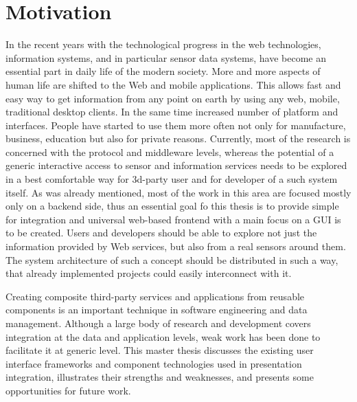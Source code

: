 \section{Motivation}
     In the recent years with the technological progress in the web technologies, information systems, and in particular sensor data systems, have become an essential part in daily life of the modern society. More and more aspects of human life are shifted to the Web and mobile applications. This allows fast and easy way to get information from any point on earth by using any web, mobile, traditional desktop clients. In the same time increased number of platform and interfaces. People have started to use them more often not only for manufacture, business, education but also for private reasons. Currently, most of the research is concerned with the protocol and middleware levels, whereas the potential of a generic interactive access to sensor and information services needs to be explored in a best comfortable way for 3d-party user and for developer of a such system itself. As was already mentioned, most of the work in this area are focused mostly only on a backend side, thus an essential goal fo this thesis is to provide simple for integration and universal web-based frontend with a main focus on a GUI is to be created. Users and developers should be able to explore not just the information provided by Web services, but also from a real sensors around them. The system architecture of such a concept should be distributed in such a way, that already implemented projects could easily interconnect with it.

     Creating composite third-party services and applications from reusable components is an important technique in software engineering and data management. Although a large body of research and development covers integration at the data and application levels, weak work has been done to facilitate it at generic level. This master thesis discusses the existing user interface frameworks and component technologies used in presentation integration, illustrates their strengths and weaknesses, and presents some opportunities for future work.

